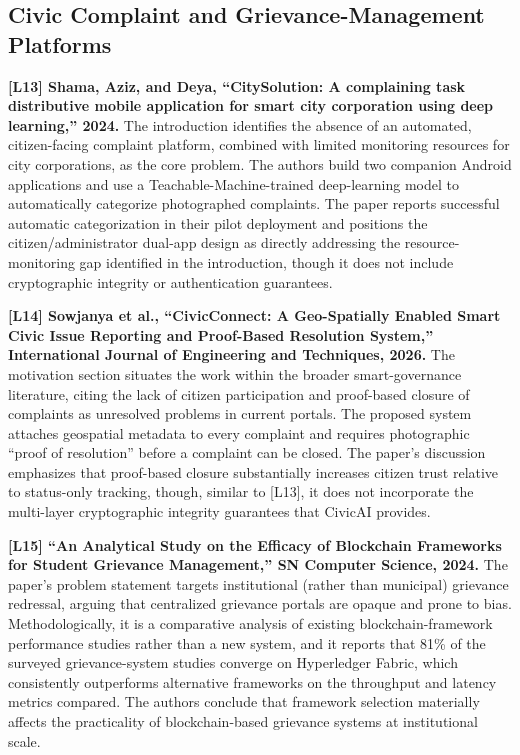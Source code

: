 \documentclass[conference]{IEEEtran}
\begin{document}
\subsection{Civic Complaint and Grievance-Management Platforms}

\textbf{[L13] Shama, Aziz, and Deya, ``CitySolution: A complaining task distributive mobile application for smart city corporation using deep learning,'' 2024.} The introduction identifies the absence of an automated, citizen-facing complaint platform, combined with limited monitoring resources for city corporations, as the core problem. The authors build two companion Android applications and use a Teachable-Machine-trained deep-learning model to automatically categorize photographed complaints. The paper reports successful automatic categorization in their pilot deployment and positions the citizen/administrator dual-app design as directly addressing the resource-monitoring gap identified in the introduction, though it does not include cryptographic integrity or authentication guarantees.

\textbf{[L14] Sowjanya et al., ``CivicConnect: A Geo-Spatially Enabled Smart Civic Issue Reporting and Proof-Based Resolution System,'' International Journal of Engineering and Techniques, 2026.} The motivation section situates the work within the broader smart-governance literature, citing the lack of citizen participation and proof-based closure of complaints as unresolved problems in current portals. The proposed system attaches geospatial metadata to every complaint and requires photographic ``proof of resolution'' before a complaint can be closed. The paper's discussion emphasizes that proof-based closure substantially increases citizen trust relative to status-only tracking, though, similar to [L13], it does not incorporate the multi-layer cryptographic integrity guarantees that CivicAI provides.

\textbf{[L15] ``An Analytical Study on the Efficacy of Blockchain Frameworks for Student Grievance Management,'' SN Computer Science, 2024.} The paper's problem statement targets institutional (rather than municipal) grievance redressal, arguing that centralized grievance portals are opaque and prone to bias. Methodologically, it is a comparative analysis of existing blockchain-framework performance studies rather than a new system, and it reports that 81\% of the surveyed grievance-system studies converge on Hyperledger Fabric, which consistently outperforms alternative frameworks on the throughput and latency metrics compared. The authors conclude that framework selection materially affects the practicality of blockchain-based grievance systems at institutional scale.
\end{document}
